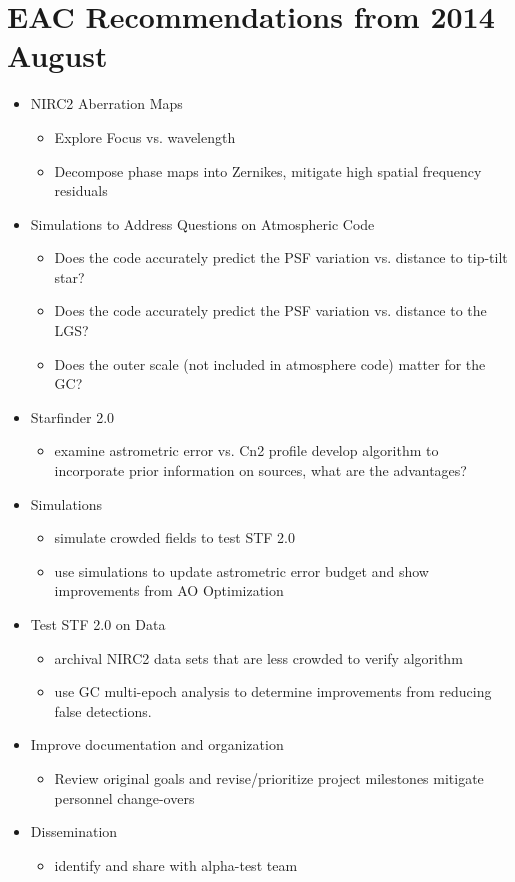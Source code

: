 \section{EAC Recommendations from 2014 August}  
\begin{itemize}
\item NIRC2 Aberration Maps
  \begin{itemize}
  \item Explore Focus vs. wavelength
  \item Decompose phase maps into Zernikes, mitigate high spatial
    frequency residuals
  \end{itemize}
\item Simulations to Address Questions on Atmospheric Code
  \begin{itemize}
  \item Does the code accurately predict the PSF variation vs. distance to tip-tilt star?
  \item Does the code accurately predict the PSF variation vs. distance to the LGS?
  \item Does the outer scale (not included in atmosphere code) matter
    for the GC?
  \end{itemize}
\item Starfinder 2.0
  \begin{itemize}
  \item examine astrometric error vs. Cn2 profile develop algorithm to
    incorporate prior information on sources, what are the advantages?
  \end{itemize}
\item Simulations
  \begin{itemize}
  \item simulate crowded fields to test STF 2.0
  \item use simulations to update astrometric error budget and show
    improvements from AO Optimization
  \end{itemize}
\item Test STF 2.0 on Data
  \begin{itemize}
  \item archival NIRC2 data sets that are less crowded to verify algorithm
  \item use GC multi-epoch analysis to determine improvements from
    reducing false detections.
  \end{itemize}
\item Improve documentation and organization
  \begin{itemize}
  \item Review original goals and revise/prioritize project milestones
    mitigate personnel change-overs
  \end{itemize}
\item Dissemination
  \begin{itemize}
  \item identify and share with alpha-test team
  \end{itemize}
\end{itemize}
